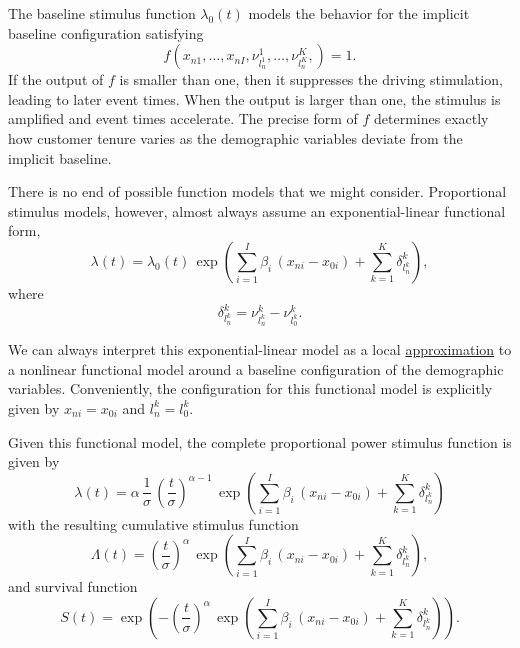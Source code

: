 \documentclass[
  letterpaper,
  DIV=11,
  numbers=noendperiod]{scrartcl}
\begin{document}
The baseline stimulus function \(\lambda_{0}(t)\) models the behavior
for the implicit baseline configuration satisfying \[
f(x_{n1}, \ldots, x_{nI},
  \nu^{1}_{l^{1}_{n}}, \ldots, \nu^{K}_{l^{K}_{n}},
) = 1.
\] If the output of \(f\) is smaller than one, then it suppresses the
driving stimulation, leading to later event times. When the output is
larger than one, the stimulus is amplified and event times accelerate.
The precise form of \(f\) determines exactly how customer tenure varies
as the demographic variables deviate from the implicit baseline.

There is no end of possible function models that we might consider.
Proportional stimulus models, however, almost always assume an
exponential-linear functional form, \[
\lambda(t)
=
\lambda_{0}(t) \,
\exp \left(
    \sum_{i = 1}^{I} \beta_{i} \, (x_{ni} - x_{0i})
  + \sum_{k = 1}^{K} \delta^{k}_{l^{k}_{n}}
\right),
\] where \[
\delta^{k}_{l^{k}_{n}}
=
\nu^{k}_{l^{k}_{n}}
-
\nu^{k}_{l^{k}_{0}}.
\]

We can always interpret this exponential-linear model as a local
\href{http://www.symplectomorphic.com/assets/case_studies/general_taylor_models.html}{approximation}
to a nonlinear functional model around a baseline configuration of the
demographic variables. Conveniently, the configuration for this
functional model is explicitly given by \(x_{ni} = x_{0i}\) and
\(l^{k}_{n} = l^{k}_{0}\).

Given this functional model, the complete proportional power stimulus
function is given by \[
\lambda(t)
=
\alpha \, \frac{1}{\sigma} \,
\left( \frac{t}{\sigma} \right)^{\alpha - 1} \,
\exp \left(
    \sum_{i = 1}^{I} \beta_{i} \, (x_{ni} - x_{0i})
  + \sum_{k = 1}^{K} \delta^{k}_{l^{k}_{n}}
\right)
\] with the resulting cumulative stimulus function \[
\Lambda(t)
=
\left( \frac{t}{\sigma} \right)^{\alpha} \,
\exp \left(
    \sum_{i = 1}^{I} \beta_{i} \, (x_{ni} - x_{0i})
  + \sum_{k = 1}^{K} \delta^{k}_{l^{k}_{n}}
\right),
\] and survival function \[
S(t)
=
\exp \left(
  - \left( \frac{t}{\sigma} \right)^{\alpha} \,
    \exp \left(
        \sum_{i = 1}^{I} \beta_{i} \, (x_{ni} - x_{0i})
      + \sum_{k = 1}^{K} \delta^{k}_{l^{k}_{n}}
    \right)
\right).
\]
\end{document}
